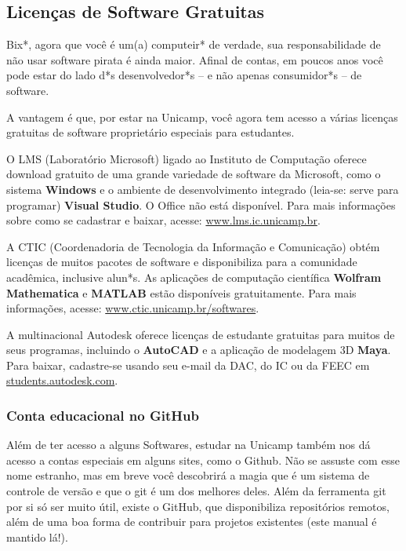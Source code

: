\subsection{Licenças de Software Gratuitas}

Bix*, agora que você é um(a) computeir* de verdade, sua responsabilidade de não
usar software pirata é ainda maior. Afinal de contas, em poucos anos você pode
estar do lado d*s desenvolvedor*s -- e não apenas consumidor*s -- de software.

A vantagem é que, por estar na Unicamp, você agora tem acesso a várias licenças
gratuitas de software proprietário especiais para estudantes.

O LMS (Laboratório Microsoft) ligado ao Instituto de Computação oferece download
gratuito de uma grande variedade de software da Microsoft, como o sistema
\textbf{Windows} e o ambiente de desenvolvimento integrado (leia-se: serve para
programar) \textbf{Visual Studio}. O Office não está disponível. Para mais
informações sobre como se cadastrar e baixar, acesse:
\url{www.lms.ic.unicamp.br}.

A CTIC (Coordenadoria de Tecnologia da Informação e Comunicação) obtém licenças
de muitos pacotes de software e disponibiliza para a comunidade acadêmica,
inclusive alun*s. As aplicações de computação científica \textbf{Wolfram
Mathematica} e \textbf{MATLAB} estão disponíveis gratuitamente. Para mais
informações, acesse: \url{www.ctic.unicamp.br/softwares}.

A multinacional Autodesk oferece licenças de estudante gratuitas para muitos de
seus programas, incluindo o \textbf{AutoCAD} e a aplicação de modelagem 3D
\textbf{Maya}. Para baixar, cadastre-se usando seu e-mail da DAC, do IC ou da
FEEC em \url{students.autodesk.com}.

\subsubsection{Conta educacional no GitHub}

Além de ter acesso a alguns Softwares, estudar na Unicamp também nos dá acesso
a contas especiais em alguns sites, como o Github. Não se assuste com esse nome
estranho, mas em breve você descobrirá a magia que é um sistema de controle de
versão e que o git é um dos melhores deles. Além da ferramenta git por si só
ser muito útil, existe o GitHub, que disponibiliza repositórios remotos, além
de uma boa forma de contribuir para projetos existentes (este manual é mantido
lá!).

